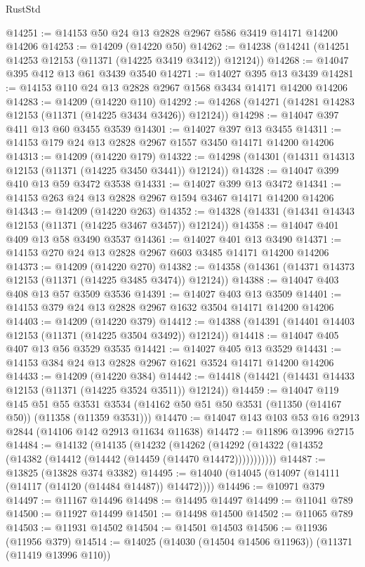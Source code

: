 \begin{lexlean}{RustStd}
\begin{coremodule}
{\begin{coremodule}
{{{{{{{{{{{{{{{{{{{{{{{{{{{{{{{{{@14251 := @14153 @50 @24 @13 @2828 @2967 @586 @3419 @14171 @14200 @14206
@14253 := @14209 (@14220 @50)
@14262 := @14238 (@14241 (@14251 @14253 @12153 (@11371 (@14225 @3419 @3412)) @12124))
@14268 := @14047 @395 @412 @13 @61 @3439 @3540
@14271 := @14027 @395 @13 @3439
@14281 := @14153 @110 @24 @13 @2828 @2967 @1568 @3434 @14171 @14200 @14206
@14283 := @14209 (@14220 @110)
@14292 := @14268 (@14271 (@14281 @14283 @12153 (@11371 (@14225 @3434 @3426)) @12124))
@14298 := @14047 @397 @411 @13 @60 @3455 @3539
@14301 := @14027 @397 @13 @3455
@14311 := @14153 @179 @24 @13 @2828 @2967 @1557 @3450 @14171 @14200 @14206
@14313 := @14209 (@14220 @179)
@14322 := @14298 (@14301 (@14311 @14313 @12153 (@11371 (@14225 @3450 @3441)) @12124))
@14328 := @14047 @399 @410 @13 @59 @3472 @3538
@14331 := @14027 @399 @13 @3472
@14341 := @14153 @263 @24 @13 @2828 @2967 @1594 @3467 @14171 @14200 @14206
@14343 := @14209 (@14220 @263)
@14352 := @14328 (@14331 (@14341 @14343 @12153 (@11371 (@14225 @3467 @3457)) @12124))
@14358 := @14047 @401 @409 @13 @58 @3490 @3537
@14361 := @14027 @401 @13 @3490
@14371 := @14153 @270 @24 @13 @2828 @2967 @603 @3485 @14171 @14200 @14206
@14373 := @14209 (@14220 @270)
@14382 := @14358 (@14361 (@14371 @14373 @12153 (@11371 (@14225 @3485 @3474)) @12124))
@14388 := @14047 @403 @408 @13 @57 @3509 @3536
@14391 := @14027 @403 @13 @3509
@14401 := @14153 @379 @24 @13 @2828 @2967 @1632 @3504 @14171 @14200 @14206
@14403 := @14209 (@14220 @379)
@14412 := @14388 (@14391 (@14401 @14403 @12153 (@11371 (@14225 @3504 @3492)) @12124))
@14418 := @14047 @405 @407 @13 @56 @3529 @3535
@14421 := @14027 @405 @13 @3529
@14431 := @14153 @384 @24 @13 @2828 @2967 @1621 @3524 @14171 @14200 @14206
@14433 := @14209 (@14220 @384)
@14442 := @14418 (@14421 (@14431 @14433 @12153 (@11371 (@14225 @3524 @3511)) @12124))
@14459 := @14047
    @119
    @145
    @51
    @55
    @3531
    @3534
    (@14162 @50 @51 @50 @3531 (@11350 (@14167 @50)) (@11358 (@11359 @3531)))
@14470 := @14047 @143 @103 @53 @16 @2913 @2844 (@14106 @142 @2913 @11634 @11638)
@14472 := @11896 @13996 @2715
@14484 := @14132
    (@14135
      (@14232
        (@14262 (@14292 (@14322 (@14352 (@14382 (@14412 (@14442 (@14459 (@14470 @14472)))))))))))
@14487 := @13825 (@13828 @374 @3382)
@14495 := @14040 (@14045 (@14097 (@14111 (@14117 (@14120 (@14484 @14487)) @14472))))
@14496 := @10971 @379
@14497 := @11167 @14496
@14498 := @14495 @14497
@14499 := @11041 @789
@14500 := @11927 @14499
@14501 := @14498 @14500
@14502 := @11065 @789
@14503 := @11931 @14502
@14504 := @14501 @14503
@14506 := @11936 (@11956 @379)
@14514 := @14025 (@14030 (@14504 @14506 @11963)) (@11371 (@11419 @13996 @110))
}}}}}}}}}}}}}}}}}}}}}}}}}}}}}}}}}
\end{coremodule}}
\end{coremodule}
\end{lexlean}

